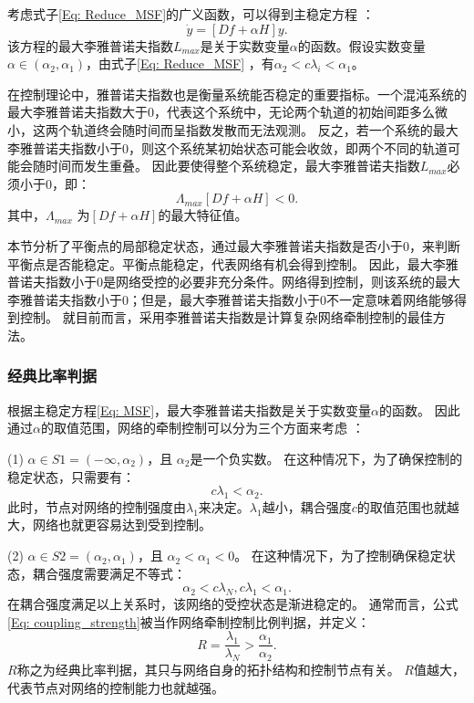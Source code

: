 考虑式子\ref{Eq: Reduce_MSF}的广义函数，可以得到主稳定方程 \cite{Sorrentino2007}：
\begin{equation}
\dot{y} = [Df + \alpha H]y.
\label{Eq: MSF}
\end{equation}
该方程的最大李雅普诺夫指数$ L_{max} $是关于实数变量$ \alpha $的函数。假设实数变量$ \alpha \in (\alpha_2, \alpha_1) $，由式子\ref{Eq: Reduce_MSF} ，有$ \alpha_2 <c\lambda_i<\alpha_1 $。

在控制理论中，雅普诺夫指数也是衡量系统能否稳定的重要指标。一个混沌系统的最大李雅普诺夫指数大于$ 0 $，代表这个系统中，无论两个轨道的初始间距多么微小，这两个轨道终会随时间而呈指数发散而无法观测。
反之，若一个系统的最大李雅普诺夫指数小于$ 0 $，则这个系统某初始状态可能会收敛，即两个不同的轨道可能会随时间而发生重叠。
因此要使得整个系统稳定，最大李雅普诺夫指数$ L_{max} $必须小于0，即：
\begin{equation}
\Lambda_{max}[Df + \alpha H]<0.
\label{Eq:princple_eigenvalue}
\end{equation}
其中，$ \Lambda_{max} $ 为$ [Df + \alpha H] $的最大特征值。

本节分析了平衡点的局部稳定状态，通过最大李雅普诺夫指数是否小于$ 0 $，来判断平衡点是否能稳定。平衡点能稳定，代表网络有机会得到控制。
因此，最大李雅普诺夫指数小于$ 0 $是网络受控的必要非充分条件。网络得到控制，则该系统的最大李雅普诺夫指数小于$ 0 $；但是，最大李雅普诺夫指数小于$ 0 $不一定意味着网络能够得到控制。
就目前而言，采用李雅普诺夫指数是计算复杂网络牵制控制的最佳方法。


\subsubsection{经典比率判据}
根据主稳定方程\ref{Eq: MSF}，最大李雅普诺夫指数是关于实数变量$ \alpha $的函数。
因此通过$ \alpha $的取值范围，网络的牵制控制可以分为三个方面来考虑 \cite{汪小帆2006}：

(1) $ \alpha \in S1 = (-\infty,\alpha_2) $，且 $ \alpha_2 $是一个负实数。
在这种情况下，为了确保控制的稳定状态，只需要有：
\begin{equation}
c\lambda_1<\alpha_2.
\end{equation}
此时，节点对网络的控制强度由$ \lambda_1 $来决定。$ \lambda_1 $越小，耦合强度$ c $的取值范围也就越大，网络也就更容易达到受到控制。

(2) $ \alpha \in S2 = (\alpha_2, \alpha_1) $，且 $ \alpha_2<\alpha_1<0 $。
在这种情况下，为了控制确保稳定状态，耦合强度需要满足不等式：
\begin{equation}
\alpha_2<c\lambda_N,
c\lambda_1<\alpha_1.
\label{Eq: coupling_strength}
\end{equation}
在耦合强度满足以上关系时，该网络的受控状态是渐进稳定的。
通常而言，公式\ref{Eq: coupling_strength}被当作网络牵制控制比例判据，并定义：
\begin{equation}
R = \frac{\lambda_1}{\lambda_N} > \frac{\alpha_1}{\alpha_2}.
\label{Eq: R}
\end{equation}
$ R $称之为经典比率判据，其只与网络自身的拓扑结构和控制节点有关。
$ R $值越大，代表节点对网络的控制能力也就越强。


